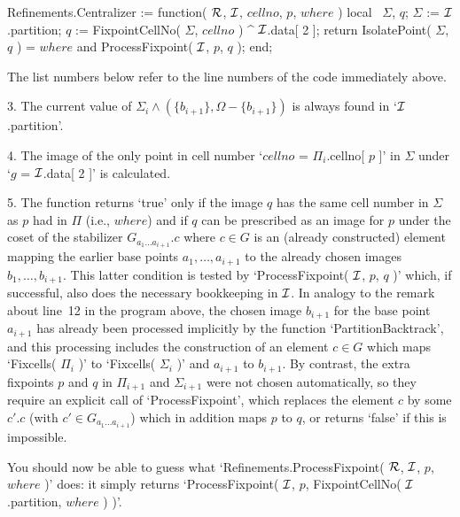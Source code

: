 \) Refinements.Centralizer := function( %
                  ${\cal R}$, ${\cal I}$, $cellno$, $p$, $where$ )
\) local \ $\Sigma$,  $q$;
\) \quad $\Sigma$ := ${\cal I}$.partition;
\) \quad $q$ := FixpointCellNo( $\Sigma$, $cellno$ ) ^ %
                  ${\cal I}$.data[ 2 ];
\) \quad return IsolatePoint( $\Sigma$, $q$ ) = $where$ %
                  and ProcessFixpoint( ${\cal I}$, $p$, $q$ );
\) end;

The list numbers below refer to the line numbers of the code immediately
above.

\beginlist%

\item{3.}
The current value of $\Sigma_i\wedge  (\{b_{i+1}\},  \Omega-\{b_{i+1}\})$
is always found in `${\cal I}$.partition'.

\item{4.}
The image of the only point in cell number  `$cellno$  =  $\Pi_i$.cellno[
$p$ ]' in $\Sigma$ under `$g$ = ${\cal I}$.data[ 2 ]' is calculated.

\item{5.}
The function returns `true' only if the  image  $q$  has  the  same  cell
number in $\Sigma$ as $p$ had in $\Pi$ (i.e., $where$) and if $q$ can  be
prescribed as an  image  for  $p$  under  the  coset  of  the  stabilizer
$G_{a_1\ldots a_{i+1}}.c$ where $c\in  G$  is  an  (already  constructed)
element mapping the  earlier  base  points  $a_1,\ldots,a_{i+1}$  to  the
already chosen images  $b_1,\ldots,b_{i+1}$.  This  latter  condition  is
tested by `ProcessFixpoint( ${\cal I}$, $p$, $q$ )' which, if successful,  also
does the necessary bookkeeping in ${\cal I}$. In analogy to  the  remark  about
line~12 in the program above, the chosen image  $b_{i+1}$  for  the  base
point $a_{i+1}$ has already been processed  implicitly  by  the  function
`PartitionBacktrack', and this processing includes the construction of an
element  $c\in  G$  which  maps  `Fixcells(  $\Pi_i$  )'  to   `Fixcells(
$\Sigma_i$  )'  and  $a_{i+1}$  to  $b_{i+1}$.  By  contrast,  the  extra
fixpoints $p$ and $q$ in $\Pi_{i+1}$ and $\Sigma_{i+1}$ were  not  chosen
automatically, so they require an  explicit  call  of  `ProcessFixpoint',
which replaces the element $c$ by some $c'.c$ (with  $c'\in  G_{a_1\ldots
a_{i+1}}$) which in addition maps $p$ to $q$, or returns `false' if  this
is impossible.

\endlist

You should now be able to  guess what `Refinements.ProcessFixpoint( ${\cal R}$,
${\cal I}$, $p$, $where$   )' does: it  simply returns  `ProcessFixpoint( ${\cal I}$,
$p$, FixpointCellNo( ${\cal I}$.partition, $where$ ) )'.

